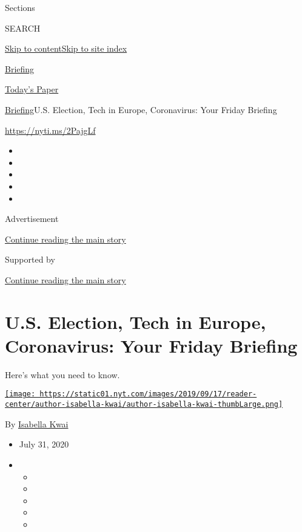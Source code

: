 Sections

SEARCH

\protect\hyperlink{site-content}{Skip to
content}\protect\hyperlink{site-index}{Skip to site index}

\href{https://www.nytimes.com/interactive/2018/briefing/global-morning-briefing-newsletter-signup.html}{Briefing}

\href{https://myaccount.nytimes.com/auth/login?response_type=cookie\&client_id=vi}{}

\href{https://www.nytimes.com/section/todayspaper}{Today's Paper}

\href{/interactive/2018/briefing/global-morning-briefing-newsletter-signup.html}{Briefing}\textbar{}U.S.
Election, Tech in Europe, Coronavirus: Your Friday Briefing

\url{https://nyti.ms/2PajgLf}

\begin{itemize}
\item
\item
\item
\item
\item
\end{itemize}

Advertisement

\protect\hyperlink{after-top}{Continue reading the main story}

Supported by

\protect\hyperlink{after-sponsor}{Continue reading the main story}

\hypertarget{us-election-tech-in-europe-coronavirus-your-friday-briefing}{%
\section{U.S. Election, Tech in Europe, Coronavirus: Your Friday
Briefing}\label{us-election-tech-in-europe-coronavirus-your-friday-briefing}}

Here's what you need to know.

\href{https://www.nytimes.com/by/isabella-kwai}{\texttt{[image: https://static01.nyt.com/images/2019/09/17/reader-center/author-isabella-kwai/author-isabella-kwai-thumbLarge.png]}}

By \href{https://www.nytimes.com/by/isabella-kwai}{Isabella Kwai}

\begin{itemize}
\item
  July 31, 2020
\item
  \begin{itemize}
  \item
  \item
  \item
  \item
  \item
  \end{itemize}
\end{itemize}

